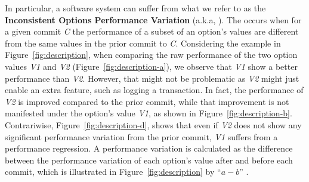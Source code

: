 In particular, a software system can suffer from what we refer to as the \textbf{Inconsistent Options Performance Variation} (a.k.a, \inconsistent). The \inconsistent occurs when for a given commit \emph{C} the performance of a subset of an option's values are different from the same values in the prior commit to \emph{C}. Considering the example in Figure~\ref{fig:description}, when comparing the raw performance of the two option values \emph{V1} and \emph{V2} (Figure~\ref{fig:description-a}), we observe that \emph{V1} show a better performance than \emph{V2}. However, that might not be problematic as \emph{V2} might just enable an extra feature, such as logging a transaction. In fact, the performance of \emph{V2} is improved compared to the prior commit, while that improvement is not manifested under the option's value \emph{V1}, as shown in Figure~\ref{fig:description-b}. %
Contrariwise, Figure~\ref{fig:description-d}, shows that even if \emph{V2} does not show any significant performance variation from the prior commit, \emph{V1} suffers from a performance regression. 
A performance variation is calculated as the difference between the performance variation of each option's value after and before each commit, which is illustrated in Figure~\ref{fig:description} by ``$a - b$'' .

